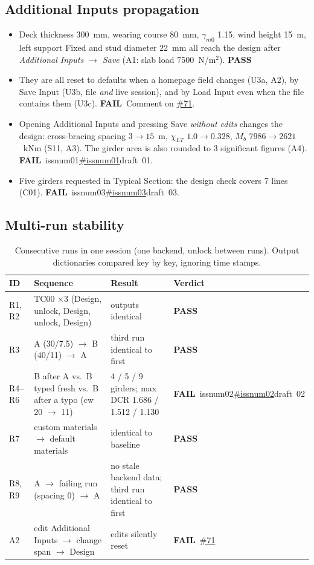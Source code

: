 \documentclass[11pt,a4paper]{article}
\newcommand{\pass}{\textcolor{ok}{\textbf{PASS}}}
\newcommand{\fail}{\textcolor{bad}{\textbf{FAIL}}}
\newcommand{\issue}[1]{\ifcsname issnum#1\endcsname\href{https://github.com/Nidhikhare12/OsdagBridge/issues/\csname issnum#1\endcsname}{\#\csname issnum#1\endcsname}\else draft~#1\fi}
\newcommand{\gh}[1]{\href{https://github.com/Nidhikhare12/OsdagBridge/issues/#1}{\##1}}
\begin{document}
\subsection{Additional Inputs propagation}
\begin{itemize}
\item Deck thickness 300~mm, wearing course 80~mm, $\gamma_{m0}$ 1.15, wind height 15~m, left support Fixed and stud diameter 22~mm all reach the design after \emph{Additional Inputs $\to$ Save} (A1: slab load 7500~N/m$^2$). \pass
\item They are all reset to defaults when a homepage field changes (U3a, A2), by Save Input (U3b, file \emph{and} live session), and by Load Input even when the file contains them (U3c). \fail\ Comment on \gh{71}.
\item Opening Additional Inputs and pressing Save \emph{without edits} changes the design: cross-bracing spacing $3\to15$~m, $\chi_{LT}$ $1.0\to0.328$, $M_b$ $7986\to2621$~kNm (S11, A3). The girder area is also rounded to 3 significant figures (A4). \fail\ \issue{01}.
\item Five girders requested in Typical Section: the design check covers 7 lines (C01). \fail\ \issue{03}.
\end{itemize}

\subsection{Multi-run stability}
\begin{table}[H]\centering\small
\caption{Consecutive runs in one session (one backend, unlock between runs). Output dictionaries compared key by key, ignoring time stamps.}
\begin{tabularx}{\linewidth}{@{}lXXl@{}}
\toprule
ID & Sequence & Result & Verdict\\
\midrule
R1, R2 & TC00 $\times3$ (Design, unlock, Design, unlock, Design) & outputs identical & \pass\\
R3 & A (30/7.5) $\to$ B (40/11) $\to$ A & third run identical to first & \pass\\
R4--R6 & B after A vs.\ B typed fresh vs.\ B after a typo (cw 20 $\to$ 11) & 4 / 5 / 9 girders; max DCR 1.686 / 1.512 / 1.130 & \fail\ \issue{02}\\
R7 & custom materials $\to$ default materials & identical to baseline & \pass\\
R8, R9 & A $\to$ failing run (spacing 0) $\to$ A & no stale backend data; third run identical to first & \pass\\
A2 & edit Additional Inputs $\to$ change span $\to$ Design & edits silently reset & \fail\ \gh{71}\\
\bottomrule
\end{tabularx}
\end{table}
\end{document}

